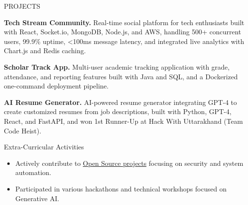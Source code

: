 \documentclass{resume} %
\begin{document}
\begin{rSection}{PROJECTS}
\item \textbf{Tech Stream Community.} Real-time social platform for tech enthusiasts built with React, Socket.io, MongoDB, Node.js, and AWS, handling 500+ concurrent users, 99.9\% uptime, <100ms message latency, and integrated live analytics with Chart.js and Redis caching.
\item \textbf{Scholar Track App.} Multi-user academic tracking application with grade, attendance, and reporting features built with Java and SQL, and a Dockerized one-command deployment pipeline.
\item \textbf{AI Resume Generator.} AI-powered resume generator integrating GPT-4 to create customized resumes from job descriptions, built with Python, GPT-4, React, and FastAPI, and won 1st Runner-Up at Hack With Uttarakhand (Team Code Heist).
\end{rSection} 

\begin{rSection}{Extra-Curricular Activities} 
\begin{itemize}
    \item 	Actively contribute to \href{https://wiggly-cyclone-4b3.notion.site/Open-Source-Contributions-196c5ae56b3480ffa68cce470f9fd6cc}{Open Source projects} focusing on security and system automation.
    \item	Participated in various hackathons and technical workshops focused on Generative AI.
\end{itemize}
\end{rSection}
\end{document}
